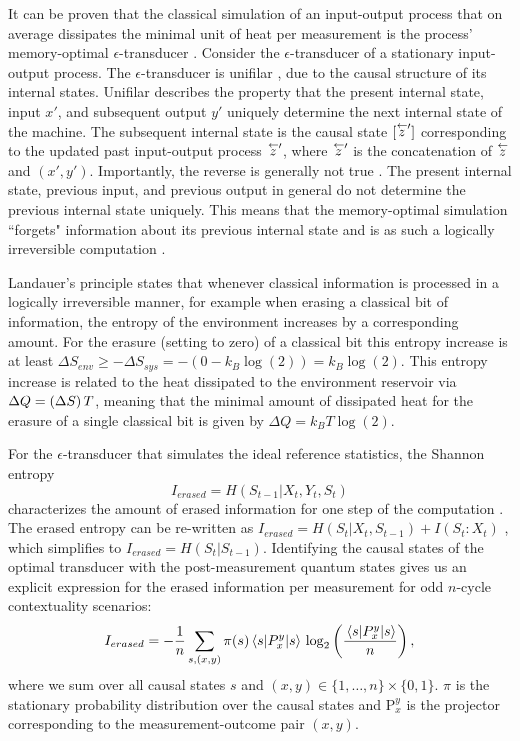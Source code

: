 It can be proven that the classical simulation of an input-output process that on average dissipates the minimal unit of heat per measurement is the process' memory-optimal $\epsilon$-transducer \cite{Cabello2016}. Consider the $\epsilon$-transducer of a stationary input-output process. The $\epsilon$-transducer is unifilar \cite{Barnett2015}, due to the causal structure of its internal states. Unifilar describes the property that the present internal state, input $x'$, and subsequent output $y'$ uniquely determine the next internal state of the machine. The subsequent internal state is the causal state $[\oset{\leftarrow}{z}']$ corresponding to the updated past input-output process $\oset{\leftarrow}{z}'$, where $\oset{\leftarrow}{z}'$ is the concatenation of $\oset{\leftarrow}{z}$ and $(x',y')$. Importantly, the reverse is generally not true \cite{Wiesner2012}. The present internal state, previous input, and previous output in general do not determine the previous internal state uniquely. This means that the memory-optimal simulation ``forgets" information about its previous internal state and is as such a logically irreversible computation \cite{Wiesner2012}.

Landauer's principle states that whenever classical information is processed in a logically irreversible manner, for example when erasing a classical bit of information, the entropy of the environment increases by a corresponding amount. For the erasure (setting to zero) of a classical bit this entropy increase is at least $\Delta S_{env}\geq -\Delta S_{sys} = -(0-k_B\log(2))=k_B\log(2)$. This entropy increase is related to the heat dissipated to the environment reservoir via $\Delta Q= (\Delta S)\thinspace T$, meaning that the minimal amount of dissipated heat for the erasure of a single classical bit is given by $\Delta Q = k_B T \log(2)$.

For the $\epsilon$-transducer that simulates the ideal reference statistics, the Shannon entropy 
\begin{equation}
I_{erased}=H(S_{t-1}\vert X_t,Y_t,S_t)
\end{equation} 
characterizes the amount of erased information for one step of the computation \cite{Wiesner2012}. The erased entropy can be re-written as $I_{erased}=H(S_t\vert X_t, S_{t-1})+I(S_t:X_t)$ \cite{Wiesner2012}, which simplifies to $I_{erased}=H(S_t\vert S_{t-1})$. Identifying the causal states of the optimal transducer with the post-measurement quantum states gives us an explicit expression for the erased information per measurement for odd $n$-cycle contextuality scenarios:
\begin{equation*}
I_{erased}= -\frac{1}{n} \sum_{s,(x,y)} \pi(s) \expval{P_x^y}{s}\thinspace\log_2\left(\frac{\expval{P_x^y}{s}}{n}\right),    
\end{equation*}
where we sum over all causal states $s$ and $(x,y)\in\{1,\dots,n\}\times\{0,1\}$. $\pi$ is the stationary probability distribution over the causal states and $\text{P}_x^y$ is the projector corresponding to the measurement-outcome pair $(x,y)$.

